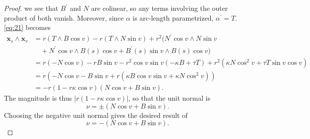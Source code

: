 \documentclass[11pt]{article}
\begin{document}
\begin{proof}
  we see that \( B^{\prime} \) and \( N \) are colinear, so any terms involving the outer product of both vanish.
  Moreover, since \( \alpha \) is arc-length parametrized, \(\alpha^{\prime} = T\).
  \cref{eq:21} becomes
  \begin{equation}
  \label{eq:23}
  \begin{aligned}
    \mathbf{x}_s \wedge \mathbf{x}_v &= r(T \wedge B \cos v) -r (T \wedge N \sin v)  +r^2(N^{\prime} \cos v \wedge N \sin v \\
                                &\quad+  N^{\prime}\cos v \wedge B(s) \cos v + B^{\prime}(s) \sin v \wedge B(s) \cos v) \\
                                &= r(-N\cos v) - rB\sin v - r^2\cos v \sin v(-\kappa B+ \tau T) + r^2(\kappa N\cos^2 v +\tau T \sin v \cos v) \\
                                &= r \left( -N\cos v - B \sin v + r(\kappa B \cos v \sin v + \kappa N \cos^2 v) \right) \\
    &= -r \left( 1- r\kappa \cos v \right)(N \cos v + B \sin v).
  \end{aligned}
\end{equation}
The magnitude is thus \( |r(1-r\kappa \cos v)| \), so that the unit normal is
\begin{equation}
\label{eq:27}
\nu = \pm (N\cos v + B \sin v).
\end{equation}
Choosing the negative unit normal gives the desired result of
\begin{equation}
\label{eq:28}
\nu = -(N \cos v + B \sin v).
\end{equation}
\end{proof}
\end{document}
